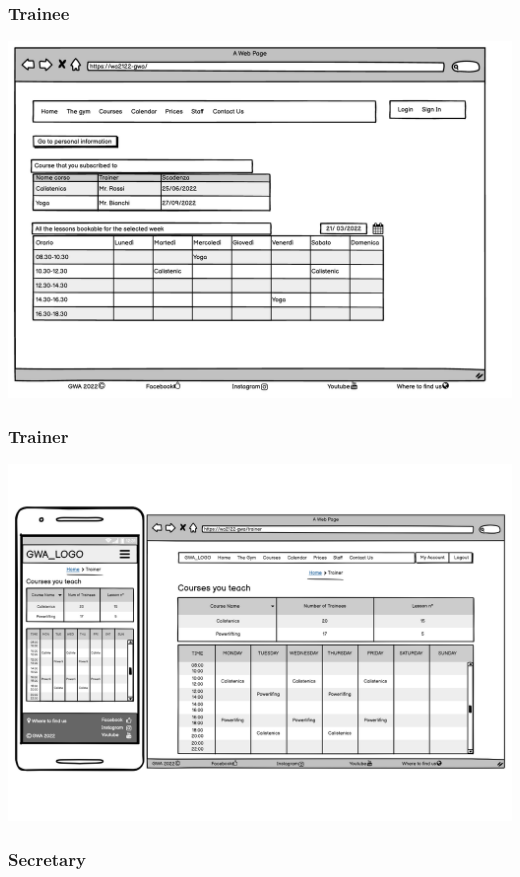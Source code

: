 \subsubsection{Trainee}
\includegraphics[width=\columnwidth]{InterfaceMockup/Trainee.pdf}

\subsubsection{Trainer}
\includegraphics[width=\columnwidth]{InterfaceMockup/Trainer/Trainer.pdf}

\subsubsection{Secretary}

